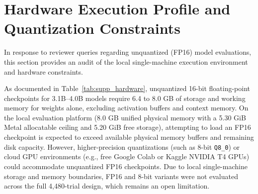 \documentclass[10pt,journal,compsoc]{IEEEtran}
\begin{document}
\section{Hardware Execution Profile and Quantization Constraints}

In response to reviewer queries regarding unquantized (FP16) model evaluations, this section provides an audit of the local single-machine execution environment and hardware constraints.

\begin{table}[!h]
\centering
\caption{Host Hardware Specifications and Memory Accounting}
\label{tab:supp_hardware}
\small
{}
\end{table}

As documented in Table~\ref{tab:supp_hardware}, unquantized 16-bit floating-point checkpoints for 3.1B--4.0B models require 6.4 to 8.0 GB of storage and working memory for weights alone, excluding activation buffers and context memory. On the local evaluation platform (8.0 GB unified physical memory with a 5.30 GiB Metal allocatable ceiling and 5.20 GiB free storage), attempting to load an FP16 checkpoint is expected to exceed available physical memory buffers and remaining disk capacity. However, higher-precision quantizations (such as 8-bit \texttt{Q8\_0}) or cloud GPU environments (e.g., free Google Colab or Kaggle NVIDIA T4 GPUs) could accommodate unquantized FP16 checkpoints. Due to local single-machine storage and memory boundaries, FP16 and 8-bit variants were not evaluated across the full 4,480-trial design, which remains an open limitation.
\end{document}
